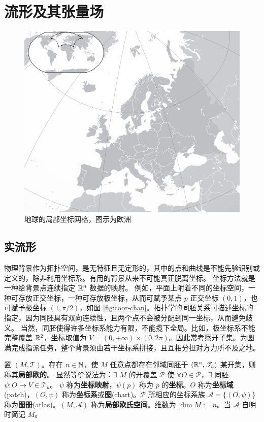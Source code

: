 \chapter{流形及其张量场}\label{appx:manifold}
    \begin{figure}[h!]\centering
    \includegraphics[width=.8\textwidth]{fig/appx/Europe-Blank.png}
    \caption{地球的局部坐标网格，图示为欧洲}
\end{figure}

\section{实流形}
物理背景作为拓扑空间，是无特征且无定形的，其中的点和曲线是不能先验识别或定义的，除非利用坐标系。有用的背景从来不可能真正脱离坐标。
坐标方法就是一种给背景点连续指定 $\mathbb{R}^n$ 数据的映射。
例如，平面上附着不同的坐标空间，一种可存放正交坐标，一种可存放极坐标，从而可赋予某点 $p$ 正交坐标 $(0,1)$，也可赋予极坐标 $(1,\pi/2)$，如图 \ref{fig:coor-chan}。拓扑学的同胚关系可描述坐标的指定，因为同胚具有双向连续性，且两个点不会被分配到同一坐标，从而避免歧义。
当然，同胚使得许多坐标系能力有限，不能揽下全局。比如，极坐标系不能完整覆盖 $\mathbb{R}^2$，坐标取值为 $V=(0,+\infty)\times(0,2\pi)$。因此常考察开子集。为圆满完成指派任务，整个背景须由若干坐标系拼接，且互相分担对方力所不及之地。

\begin{definition}
    置 $(M,\mathscr T)$。存在 $n\in\mathbb{N}$，使 $M$ 任意点都存在邻域同胚于 $(\mathbb{R}^n,\mathscr T_u)$ 某开集，则称其\textbf{局部欧的}。
    显然等价说法为：$\exists$ $M$ 的开覆盖 $\mathscr P$ 使 $\forall O\in\mathscr P$，$\exists$ 同胚 $\psi:O\to V\in\mathscr T_u$。
    $\psi$ 称为\textbf{坐标映射}，$\psi(p)$ 称为 $p$ 的\textbf{坐标}。$O$ 称为\textbf{坐标域}(patch)，$(O,\psi)$ 称为\textbf{坐标系}或\textbf{图}(chart)。$\mathscr P$ 所相应的坐标系族 $\mathcal A=\{(O,\psi)\}$ 称为\textbf{图册}(atlas)。$(M,\mathcal A)$ 称为\textbf{局部欧氏空间}。维数为 $\dim M:=n$。当 $\mathcal A$ 自明时简记 $M$。
\end{definition}

